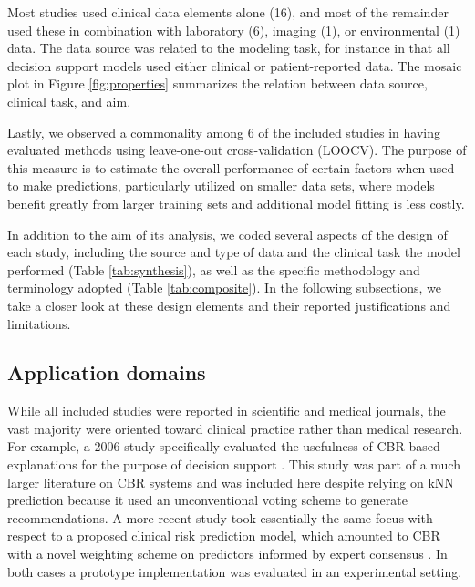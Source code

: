\documentclass[sn-mathphys,Numbered,pdflatex]{sn-jnl}
\theoremstyle{remark}
\theoremstyle{definition}
\newcommand{\hl}[1]{#1}
\begin{document}
\hl{Most studies used clinical data elements alone
(16),
and most of the remainder used these in combination with laboratory
(6),
imaging
(1),
or environmental
(1)
data. The data source was related to the modeling task, for instance in that all decision support models used either clinical or patient-reported data.
The mosaic plot in Figure }\ref{fig:properties}\hl{ summarizes the relation between data source, clinical task, and aim.}

Lastly, we observed a commonality among 6 of the included studies in
having evaluated methods using leave-one-out cross-validation (LOOCV).
The purpose of this measure is to estimate the overall performance of
certain factors when used to make predictions, particularly utilized on
smaller data sets, where models benefit greatly from larger training
sets and additional model fitting is less costly.

In addition to the aim of its analysis, we coded several aspects of the
design of each study, including the source and type of data and the
clinical task the model performed (Table \ref{tab:synthesis}), as well
as the specific methodology and terminology adopted (Table
\ref{tab:composite}). In the following subsections, we take a closer
look at these design elements and their reported justifications and
limitations.

\subsection{Application domains}\label{application-domains}

While all included studies were reported in scientific and medical
journals, the vast majority were oriented toward clinical practice
rather than medical research. For example, a 2006 study specifically
evaluated the usefulness of CBR-based explanations for the purpose of
decision support \citep{Doyle2006}. This study was part of a much larger
literature on CBR systems and was included here despite relying on
\hl{kNN} prediction because it used an unconventional voting scheme to
generate recommendations. A more recent study took essentially the same
focus with respect to a proposed clinical risk prediction model, which
amounted to CBR with a novel weighting scheme on predictors informed by
expert consensus \citep{Fang2021}. In both cases a prototype
implementation was \hl{evaluated} in an experimental \hl{setting.}
\end{document}
